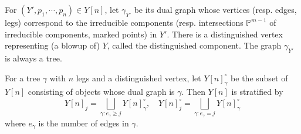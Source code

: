 \documentclass[11pt]{amsart}
\newcommand{\PP}{\mathbb{P}}
\begin{document}
For $(Y',p_1,\cdots, p_n)\in Y[n]$, let $\gamma_{Y'}$ be its dual graph whose vertices (resp. edges, legs) correspond to the irreducible components (resp. intersections $\PP^{m-1}$ of irreducible components, marked points) in $Y'$. There is a distinguished vertex representing (a blowup of) $Y$, called the distinguished component. The graph $\gamma_{Y'}$ is always a tree. 

For a tree $\gamma$ with $n$ legs and a distinguished vertex, let $Y[n]^\circ_\gamma$ be the subset of $Y[n]$ consisting of objects whose dual graph is $\gamma$.  
Then $Y[n]$ is stratified by  %
$$Y[n]_j=\bigsqcup_{\gamma: e_\gamma\ge j} Y[n]^\circ_\gamma, \quad Y[n]^\circ_j=\bigsqcup_{\gamma: e_\gamma= j} Y[n]^\circ_\gamma$$
where $e_\gamma$ is the number of edges in $\gamma$.
\end{document}
